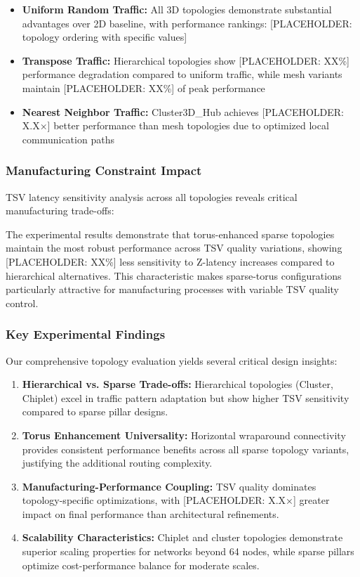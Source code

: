 \documentclass[11pt]{article}
\begin{document}
\begin{itemize}[leftmargin=1.5em]
    \item \textbf{Uniform Random Traffic:} All 3D topologies demonstrate substantial advantages over 2D baseline, with performance rankings: [PLACEHOLDER: topology ordering with specific values]
    \item \textbf{Transpose Traffic:} Hierarchical topologies show [PLACEHOLDER: XX\%] performance degradation compared to uniform traffic, while mesh variants maintain [PLACEHOLDER: XX\%] of peak performance
    \item \textbf{Nearest Neighbor Traffic:} Cluster3D\_Hub achieves [PLACEHOLDER: X.X×] better performance than mesh topologies due to optimized local communication paths
\end{itemize}

\subsubsection{Manufacturing Constraint Impact}

TSV latency sensitivity analysis across all topologies reveals critical manufacturing trade-offs:

The experimental results demonstrate that torus-enhanced sparse topologies maintain the most robust performance across TSV quality variations, showing [PLACEHOLDER: XX\%] less sensitivity to Z-latency increases compared to hierarchical alternatives. This characteristic makes sparse-torus configurations particularly attractive for manufacturing processes with variable TSV quality control.

\subsubsection{Key Experimental Findings}

Our comprehensive topology evaluation yields several critical design insights:

\begin{enumerate}[leftmargin=1.5em]
    \item \textbf{Hierarchical vs. Sparse Trade-offs:} Hierarchical topologies (Cluster, Chiplet) excel in traffic pattern adaptation but show higher TSV sensitivity compared to sparse pillar designs.
    
    \item \textbf{Torus Enhancement Universality:} Horizontal wraparound connectivity provides consistent performance benefits across all sparse topology variants, justifying the additional routing complexity.
    
    \item \textbf{Manufacturing-Performance Coupling:} TSV quality dominates topology-specific optimizations, with [PLACEHOLDER: X.X×] greater impact on final performance than architectural refinements.
    
    \item \textbf{Scalability Characteristics:} Chiplet and cluster topologies demonstrate superior scaling properties for networks beyond 64 nodes, while sparse pillars optimize cost-performance balance for moderate scales.
\end{enumerate}
\end{document}
